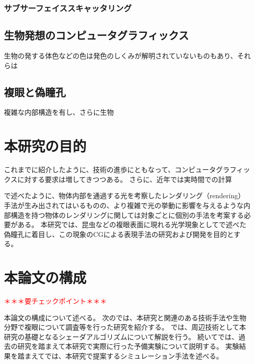 \subsubsection*{サブサーフェイススキャッタリング}
\label{SSSSSS}



\subsection{生物発想のコンピュータグラフィックス}

生物の発する体色などの色は発色のしくみが解明されていないものもあり、それらは

\subsection{複眼と偽瞳孔}
\label{SSCompoundeyeandpseudopupil}
複雑な内部構造を有し、さらに生物




\section{本研究の目的}
\label{SObjective}

これまでに紹介したように、技術の進歩にともなって、コンピュータグラフィックスに対する要求は増してきつつある。
さらに、近年では実時間での計算

で述べたように、物体内部を通過する光を考察したレンダリング（rendering）手法が生み出されてはいるものの、より複雑で光の挙動に影響を与えるような内部構造を持つ物体のレンダリングに関しては対象ごとに個別の手法を考案する必要がある。
本研究では、昆虫などの複眼表面に現れる光学現象としてで述べた偽瞳孔に着目し、この現象のCGによる表現手法の研究および開発を目的とする。

\section{本論文の構成}
\label{SPaper_structure}

\textcolor{red}{＊＊＊要チェックポイント＊＊＊}

本論文の構成について述べる。
次のでは、本研究と関連のある技術手法や生物分野で複眼について調査等を行った研究を紹介する。
では、周辺技術として本研究の基礎となるシェーダアルゴリズムについて解説を行う。
続いてでは、過去の研究を踏まえて本研究で実際に行った予備実験について説明する。
実験結果を踏まえてでは、本研究で提案するシミュレーション手法を述べる。
